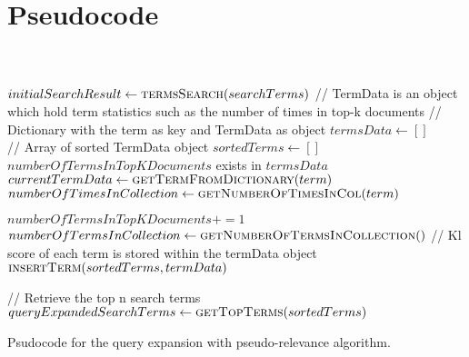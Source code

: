 \section{Pseudocode}
\label{ap:pseudocode}
\begin{algorithm}
  \begin{algorithmic}
     \\
     \\

    \State $initialSearchResult \gets \Call{termsSearch}{searchTerms}$
    \State // TermData is an object which hold term statistics such as the number of times in top-k documents
    \State // Dictionary with the term as key and TermData as object
    \State $termsData \gets [ ]$ \\
    \State // Array of sorted TermData object
    \State $sortedTerms \gets [ ]$ \\

    \State $numberOfTermsInTopKDocuments$
         exists in $termsData$
          \State $currentTermData \gets \Call{getTermFromDictionary}{term}$
          \State {}
        \Else
          \State $numberOfTimesInCollection \gets \Call{getNumberOfTimesInCol}{term}$
          \State {}
        \EndIf

        \State $numberOfTermsInTopKDocuments += 1$
      \EndFor
    \EndFor \\

    \State $numberOfTermsInCollection \gets \Call{getNumberOfTermsInCollection}$
      \State // Kl score of each term is stored within the termData object
      \State {}
      \State $\Call{insertTerm}{sortedTerms, termData}$
    \EndFor

    \State {}

    \State // Retrieve the top n search terms
    \State $queryExpandedSearchTerms \gets \Call{getTopTerms}{sortedTerms}$

  \end{algorithmic}
  \caption{Psudocode for the query expansion with pseudo-relevance algorithm.}
\end{algorithm}
\newpage
